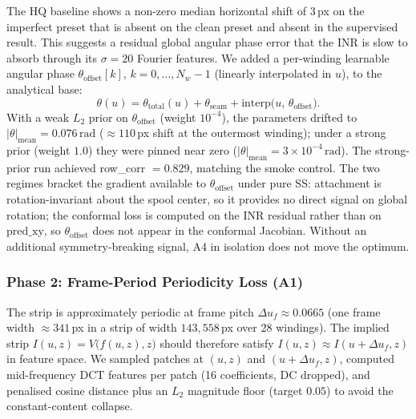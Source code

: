 \documentclass[11pt,a4paper]{article}
\begin{document}
The HQ baseline shows a non-zero median horizontal shift of $3$\,px on the imperfect preset that is absent on the clean preset and absent in the supervised result. This suggests a residual global angular phase error that the INR is slow to absorb through its $\sigma = 20$ Fourier features. We added a per-winding learnable angular phase $\theta_{\mathrm{offset}}[k]$, $k = 0, \ldots, N_w - 1$ (linearly interpolated in $u$), to the analytical base:
\begin{equation}
\theta(u) = \theta_{\mathrm{total}}(u) + \theta_{\mathrm{seam}} + \mathrm{interp}\bigl(u,\, \theta_{\mathrm{offset}}\bigr).
\end{equation}
With a weak $L_2$ prior on $\theta_{\mathrm{offset}}$ (weight $10^{-4}$), the parameters drifted to $|\theta|_{\mathrm{mean}} = 0.076\,\mathrm{rad}$ ($\approx 110$\,px shift at the outermost winding); under a strong prior (weight $1.0$) they were pinned near zero ($|\theta|_{\mathrm{mean}} = 3\times 10^{-4}\,\mathrm{rad}$). The strong-prior run achieved row\_corr $= 0.829$, matching the smoke control. The two regimes bracket the gradient available to $\theta_{\mathrm{offset}}$ under pure SS: attachment is rotation-invariant about the spool center, so it provides no direct signal on global rotation; the conformal loss is computed on the INR residual rather than on $\mathrm{pred\_xy}$, so $\theta_{\mathrm{offset}}$ does not appear in the conformal Jacobian. Without an additional symmetry-breaking signal, A4 in isolation does not move the optimum.

\subsubsection{Phase 2: Frame-Period Periodicity Loss (A1)}
\label{sec:phase2_a1}

The strip is approximately periodic at frame pitch $\Delta u_f \approx 0.0665$ (one frame width $\approx 341$\,px in a strip of width $143{,}558$\,px over $28$ windings). The implied strip $I(u, z) = V\bigl(f(u, z), z\bigr)$ should therefore satisfy $I(u, z) \approx I(u + \Delta u_f, z)$ in feature space. We sampled patches at $(u, z)$ and $(u + \Delta u_f, z)$, computed mid-frequency DCT features per patch (16 coefficients, DC dropped), and penalised cosine distance plus an $L_2$ magnitude floor (target $0.05$) to avoid the constant-content collapse.
\end{document}

